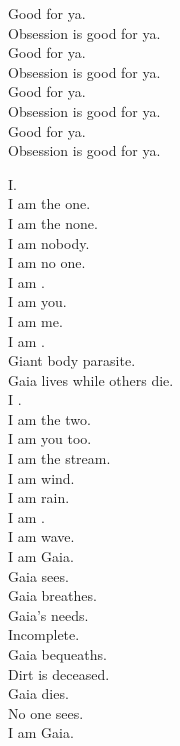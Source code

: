 Good for ya. \\
Obsession is good for ya. \\
Good for ya. \\
Obsession is good for ya. \\
Good for ya. \\
Obsession is good for ya. \\
Good for ya. \\
Obsession is good for ya. \\




I. \\
I am the one. \\
I am the none. \\
I am nobody. \\
I am no one. \\
I am . \\
I am you. \\
I am me. \\
I am . \\

Giant body parasite. \\
Gaia lives while others die. \\

I . \\
I am the two. \\
I am you too. \\
I am the stream. \\
I am wind. \\
I am rain. \\
I am . \\
I am wave. \\
I am Gaia. \\

Gaia sees. \\
Gaia breathes. \\
Gaia's needs. \\
Incomplete. \\
Gaia bequeaths. \\
Dirt is deceased. \\
Gaia dies. \\
No one sees. \\

I am Gaia. \\

